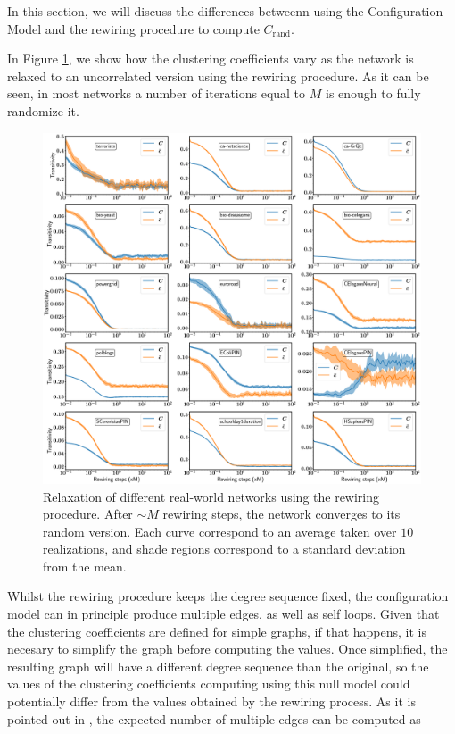 \documentclass{article}
\begin{document}
In this section, we will discuss the differences betweenn using the Configuration Model and the rewiring procedure to compute $C_{\mathrm{rand}}$.

In Figure \ref{fig:relaxation}, we show how the clustering coefficients vary as the network is relaxed to an uncorrelated version using the rewiring procedure. As it can be seen, in most networks a number of iterations equal to $M$ is enough to fully randomize it. 

\begin{figure}[ht!]
\centering
\includegraphics[scale=0.24]{./figs/relaxation.pdf}
\caption{Relaxation of different real-world networks using the rewiring procedure. After $\sim M$ rewiring steps, the network converges to its random version. Each curve correspond to an average taken over $10$ realizations, and shade regions correspond to a standard deviation from the mean.}
\label{fig:relaxation}
\end{figure}

Whilst the rewiring procedure keeps the degree sequence fixed, the configuration model can in principle produce multiple edges, as well as self loops. Given that the clustering coefficients are defined for simple graphs, if that happens, it is necesary to simplify the graph before computing the values. Once simplified, the resulting graph will have a different degree sequence than the original, so the values of the clustering coefficients computing using this null model could potentially differ from the values obtained by the rewiring process. As it is pointed out in \cite{NewmanBook}, the expected number of multiple edges can be computed as
\end{document}
